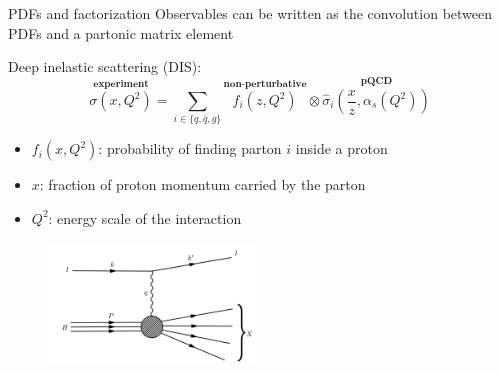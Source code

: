 \documentclass[8pt,t]{beamer}
\begin{document}
\begin{frame}{PDFs and factorization}
  Observables can be written as the convolution between PDFs and a partonic matrix element

  \vspace*{1em}
  Deep inelastic scattering (DIS):
  \begin{equation*}
    \stackrel{\textbf{experiment}}{\sigma(x,Q^2)}=\sum_{i\in \{q,\bar{q},g\}} \stackrel{\textbf{non-perturbative}}{f_i\left(z, Q^2\right)} \otimes \stackrel{\textbf{pQCD}}{\hat{\sigma}_i\left(\frac{x}{z}, \alpha_s(Q^2)\right)}
  \end{equation*}
  \begin{itemize}
    \item $f_i(x,Q^2)$: probability of finding parton $i$ inside a proton
    \item $x$: fraction of proton momentum carried by the parton
    \item $Q^2$: energy scale of the interaction
  \end{itemize}

  \begin{figure}
    \includegraphics[width=0.5\textwidth]{dis_schematic.png}
  \end{figure}

\end{frame}
\end{document}
